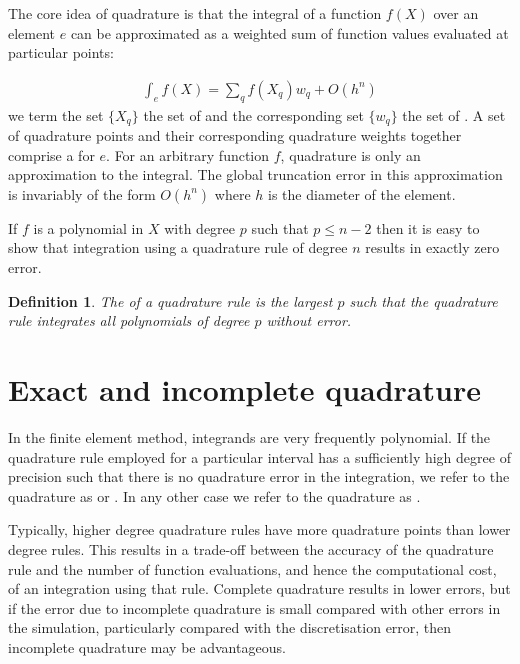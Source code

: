 \documentclass{book}
\newtheorem{definition}{Definition}
\begin{document}
The core idea of quadrature is that the integral of a function
\(f(X)\) over an element \(e\) can be approximated as
a weighted sum of function values evaluated at particular points:

\label{\detokenize{1_quadrature:equation-quadrature}}\begin{equation}\label{equation:1_quadrature:quadrature}
\begin{split}\int_e f(X)  = \sum_{q} f(X_q) w_q + O(h^n)\end{split}
\end{equation}
we term the set \(\{X_q\}\) the set of  and the
corresponding set \(\{w_q\}\) the set of . A set of
quadrature points and their corresponding quadrature weights together
comprise a  for \(e\). For an arbitrary function \(f\),
quadrature is only an approximation to the integral. The global
truncation error in this approximation is invariably of the form
\(O(h^n)\) where \(h\) is the diameter of the element.

If \(f\) is a polynomial in \(X\) with degree \(p\) such that
\(p\leq n-2\) then it is easy to show that integration using a
quadrature rule of degree \(n\) results in exactly zero error.

\label{\detokenize{1_quadrature:degree-of-precision}}
\begin{definition}
The  of a quadrature rule is the largest \(p\)
such that the quadrature rule integrates all polynomials of degree
\(p\) without error.
\end{definition}

\section{Exact and incomplete quadrature}
\label{\detokenize{1_quadrature:exact-and-incomplete-quadrature}}
In the finite element method, integrands are very frequently
polynomial. If the quadrature rule employed for a particular interval
has a sufficiently high degree of precision such that there is no
quadrature error in the integration, we refer to the quadrature as
 or . In any other case we refer to the quadrature as
.

Typically, higher degree quadrature rules have more quadrature points
than lower degree rules. This results in a trade-off between the
accuracy of the quadrature rule and the number of function
evaluations, and hence the computational cost, of an integration using
that rule. Complete quadrature results in lower errors, but if the
error due to incomplete quadrature is small compared with other errors
in the simulation, particularly compared with the discretisation
error, then incomplete quadrature may be advantageous.
\end{document}
